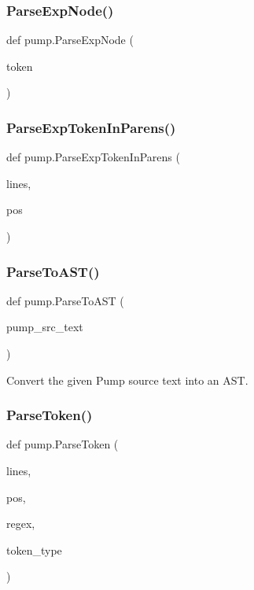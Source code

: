 \subsubsection{\texorpdfstring{Parse\+Exp\+Node()}{ParseExpNode()}}
{\footnotesize\ttfamily def pump.\+Parse\+Exp\+Node (\begin{DoxyParamCaption}\item[{}]{token }\end{DoxyParamCaption})}

\mbox{\label{namespacepump_ae094486db14ecec9347129c5f230042d}} 
\subsubsection{\texorpdfstring{Parse\+Exp\+Token\+In\+Parens()}{ParseExpTokenInParens()}}
{\footnotesize\ttfamily def pump.\+Parse\+Exp\+Token\+In\+Parens (\begin{DoxyParamCaption}\item[{}]{lines,  }\item[{}]{pos }\end{DoxyParamCaption})}

\mbox{\label{namespacepump_a56ac10a83a3a875d305c9aae71fc0549}} 
\subsubsection{\texorpdfstring{Parse\+To\+A\+S\+T()}{ParseToAST()}}
{\footnotesize\ttfamily def pump.\+Parse\+To\+A\+ST (\begin{DoxyParamCaption}\item[{}]{pump\+\_\+src\+\_\+text }\end{DoxyParamCaption})}

\begin{DoxyVerb}Convert the given Pump source text into an AST.\end{DoxyVerb}
 \mbox{\label{namespacepump_a23761d99dd43d642e94d845218573035}} 
\subsubsection{\texorpdfstring{Parse\+Token()}{ParseToken()}}
{\footnotesize\ttfamily def pump.\+Parse\+Token (\begin{DoxyParamCaption}\item[{}]{lines,  }\item[{}]{pos,  }\item[{}]{regex,  }\item[{}]{token\+\_\+type }\end{DoxyParamCaption})}

